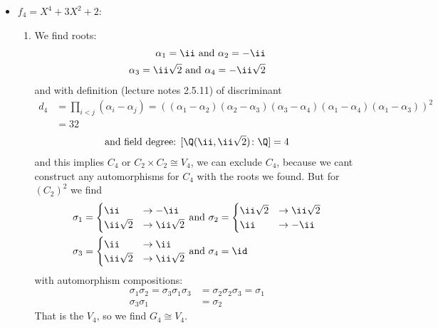 \begin{solution}
\begin{itemize}
\begin{enumerate}
		\end{enumerate}
		\item $f_4 = X^4 + 3X^2 + 2$:
		\begin{enumerate}
			\item We find roots: 
				\begin{align*}
					\alpha_1 = \ii \and \alpha_2=-\ii\\
					\alpha_3 = \ii\sqrt{2} \and \alpha_4 = -\ii\sqrt{2}
				\end{align*}
			and with definition (lecture notes 2.5.11) of discriminant
			\begin{align*}
				d_4 &= \prod_{i < j} (\alpha_i -\alpha_j) =((\alpha_1 - \alpha_2)(\alpha_2-\alpha_3)(\alpha_3-\alpha_4)(\alpha_1-\alpha_4)(\alpha_1-\alpha_3))^2\\
				&=32
			\end{align*}
			\begin{align*}
				\text{and field degree: }[\Q(\ii, \ii\sqrt{2})\colon \Q] = 4
			\end{align*}
			and this implies $C_4$ or $C_2 \times C_2 \cong V_4$, we can exclude $C_4$, because we cant construct any automorphisms for $C_4$ with the roots we found. But for $(C_2)^2$ we find
			\begin{align*}
				\sigma_1 = \begin{cases}
					\ii &\to -\ii\\
					\ii\sqrt{2} &\to \ii\sqrt{2}\\
				\end{cases} &\and
				\sigma_2 = \begin{cases}
					\ii \sqrt{2} &\to \ii \sqrt{2}\\
					\ii &\to -\ii 
				\end{cases}\\
				\sigma_3 = \begin{cases}
					\ii &\to \ii\\
					\ii \sqrt{2} &\to \ii \sqrt{2}
				\end{cases} &\and
				\sigma_4 = \id
			\end{align*}
			with automorphism compositions:
			\begin{align*}
				\sigma_1\sigma_2 = \sigma_3 \sigma_1 \sigma_3 &= \sigma_2 \sigma_2 \sigma_3 = \sigma_1\\
				\sigma_3 \sigma_1 &= \sigma_2
			\end{align*}
			That is the $V_4$, so we find $G_4 \cong V_4$. 
		\end{enumerate}
		\end{itemize}
\end{solution}

